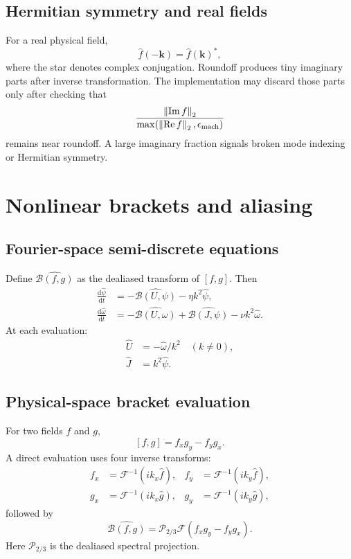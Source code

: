 \documentclass[11pt]{article}
\newcommand{\dd}{\mathrm{d}}
\newcommand{\vect}[1]{\bm{#1}}
\newcommand{\bracket}[2]{\left[#1,#2\right]}
\newcommand{\F}{\mathcal{F}}
\newcommand{\InvF}{\mathcal{F}^{-1}}
\newcommand{\norm}[1]{\left\lVert #1\right\rVert}
\begin{document}
\subsection{Hermitian symmetry and real fields}

For a real physical field,
\begin{equation}
\widehat f(-\vect{k})=\widehat f(\vect{k})^*,
\end{equation}
where the star denotes complex conjugation. Roundoff produces tiny imaginary parts after inverse transformation. The implementation may discard those parts only after checking that
\begin{equation}
\frac{\norm{\operatorname{Im}f}_2}
{\max(\norm{\operatorname{Re}f}_2,\epsilon_{\rm mach})}
\end{equation}
remains near roundoff. A large imaginary fraction signals broken mode indexing or Hermitian symmetry.

\section{Nonlinear brackets and aliasing}
\label{sec:aliasing}

\subsection{Fourier-space semi-discrete equations}

Define $\widehat{\mathcal{B}(f,g)}$ as the dealiased transform of $[f,g]$. Then
\begin{align}
\frac{\dd\widehat\psi}{\dd t}
&=-\widehat{\mathcal{B}(U,\psi)}
-\eta k^2\widehat\psi,
\label{eq:psihat}\\
\frac{\dd\widehat\omega}{\dd t}
&=-\widehat{\mathcal{B}(U,\omega)}
+\widehat{\mathcal{B}(J,\psi)}
-\nu k^2\widehat\omega.
\label{eq:omegahat}
\end{align}
At each evaluation:
\begin{align}
\widehat U&=-\widehat\omega/k^2
\quad (k\ne0),\\
\widehat J&=k^2\widehat\psi.
\end{align}

\subsection{Physical-space bracket evaluation}

For two fields $f$ and $g$,
\begin{equation}
\bracket{f}{g}=f_xg_y-f_yg_x.
\end{equation}
A direct evaluation uses four inverse transforms:
\begin{align}
f_x&=\InvF(ik_x\widehat f),&
f_y&=\InvF(ik_y\widehat f),\\
g_x&=\InvF(ik_x\widehat g),&
g_y&=\InvF(ik_y\widehat g),
\end{align}
followed by
\begin{equation}
\widehat{\mathcal{B}(f,g)}
=\mathcal{P}_{2/3}\F(f_xg_y-f_yg_x).
\label{eq:bracketps}
\end{equation}
Here $\mathcal{P}_{2/3}$ is the dealiased spectral projection.
\end{document}
